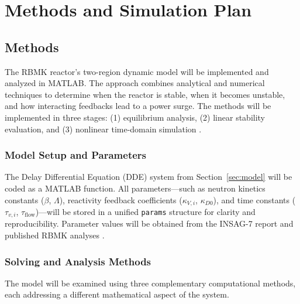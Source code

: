 \documentclass[11pt]{article}
\begin{document}
\section{Methods and Simulation Plan}
\subsection{Methods}
The RBMK reactor’s two-region dynamic model will be implemented and analyzed in MATLAB. The approach combines analytical and numerical techniques to determine when the reactor is stable, when it becomes unstable, and how interacting feedbacks lead to a power surge. The methods will be implemented in three stages: (1) equilibrium analysis, (2) linear stability evaluation, and (3) nonlinear time-domain simulation \cite{Uspuras2015,INIS_Multidimensional}.

\subsubsection{Model Setup and Parameters}
The Delay Differential Equation (DDE) system from Section~\ref{sec:model} will be coded as a MATLAB function. All parameters---such as neutron kinetics constants ($\beta$, $\Lambda$), reactivity feedback coefficients ($\kappa_{V,i}$, $\kappa_{D0}$), and time constants ($\tau_{v,i}$, $\tau_{\mathrm{flow}}$)---will be stored in a unified \texttt{params} structure for clarity and reproducibility. Parameter values will be obtained from the INSAG-7 report and published RBMK analyses \cite{INSAG7}.

\subsubsection{Solving and Analysis Methods}
The model will be examined using three complementary computational methods, each addressing a different mathematical aspect of the system.
\end{document}
